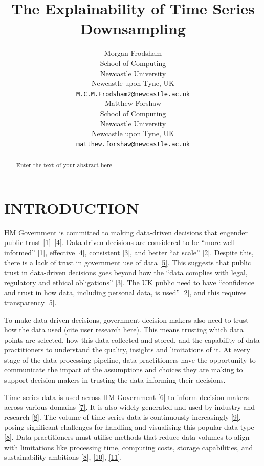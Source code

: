 \documentclass{article}
\title{The Explainability of Time Series Downsampling}
\author{
    Morgan Frodsham
   \\
    School of Computing \\
    Newcastle University \\
  Newcastle upon Tyne, UK \\
  \texttt{\href{mailto:M.C.M.Frodsham2@newcastle.ac.uk}{\nolinkurl{M.C.M.Frodsham2@newcastle.ac.uk}}} \\
   \And
    Matthew Forshaw
   \\
    School of Computing \\
    Newcastle University \\
  Newcastle upon Tyne, UK \\
  \texttt{\href{mailto:matthew.forshaw@newcastle.ac.uk}{\nolinkurl{matthew.forshaw@newcastle.ac.uk}}} \\
  }
\begin{document}
\maketitle


\begin{abstract}
Enter the text of your abstract here.
\end{abstract}


\hypertarget{introduction}{%
\section{INTRODUCTION}\label{introduction}}

HM Government is committed to making data-driven decisions that engender
public trust
\protect\hyperlink{ref-data2017}{{[}1{]}}--\protect\hyperlink{ref-data2022}{{[}4{]}}.
Data-driven decisions are considered to be ``more well-informed''
\protect\hyperlink{ref-data2017}{{[}1{]}}, effective
\protect\hyperlink{ref-data2022}{{[}4{]}}, consistent
\protect\hyperlink{ref-data2021}{{[}3{]}}, and better ``at scale''
\protect\hyperlink{ref-data2020}{{[}2{]}}. Despite this, there is a lack
of trust in government use of data
\protect\hyperlink{ref-trust}{{[}5{]}}. This suggests that public trust
in data-driven decisions goes beyond how the ``data complies with legal,
regulatory and ethical obligations''
\protect\hyperlink{ref-data2021}{{[}3{]}}. The UK public need to have
``confidence and trust in how data, including personal data, is used''
\protect\hyperlink{ref-data2020}{{[}2{]}}, and this requires
transparency \protect\hyperlink{ref-trust}{{[}5{]}}.

To make data-driven decisions, government decision-makers also need to
trust how the data used (cite user research here). This means trusting
which data points are selected, how this data collected and stored, and
the capability of data practitioners to understand the quality, insights
and limitations of it. At every stage of the data processing pipeline,
data practitioners have the opportunity to communicate the impact of the
assumptions and choices they are making to support decision-makers in
trusting the data informing their decisions.

Time series data is used across HM Government
\protect\hyperlink{ref-pathway}{{[}6{]}} to inform decision-makers
across various domains \protect\hyperlink{ref-onstool}{{[}7{]}}. It is
also widely generated and used by industry and research
\protect\hyperlink{ref-TVStore}{{[}8{]}}. The volume of time series data
is continuously increasingly \protect\hyperlink{ref-datapoint}{{[}9{]}},
posing significant challenges for handling and visualising this popular
data type \protect\hyperlink{ref-TVStore}{{[}8{]}}. Data practitioners
must utilise methods that reduce data volumes to align with limitations
like processing time, computing costs, storage capabilities, and
sustainability ambitions \protect\hyperlink{ref-TVStore}{{[}8{]}},
\protect\hyperlink{ref-Sveinn}{{[}10{]}},
\protect\hyperlink{ref-Shift}{{[}11{]}}.
\end{document}
